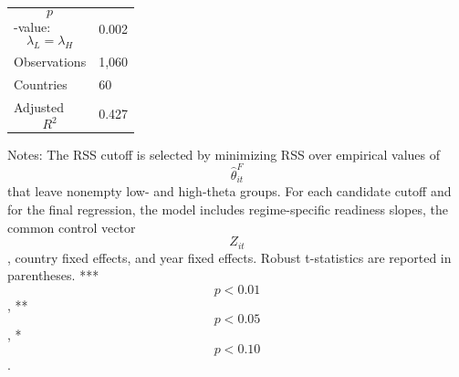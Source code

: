 \begin{table}[H]
\begin{threeparttable}
\begin{tabularx}{\textwidth}{lY}
$$p$$-value: $$\lambda_L=\lambda_H$$ & 0.002 \\
Observations & 1,060 \\
Countries & 60 \\
Adjusted $$R^2$$ & 0.427 \\
\bottomrule
\end{tabularx}
\begin{tablenotes}[flushleft]\footnotesize
\item Notes: The RSS cutoff is selected by minimizing RSS over empirical values of $$\widehat{\theta}^{F}_{it}$$ that leave nonempty low- and high-theta groups. For each candidate cutoff and for the final regression, the model includes regime-specific readiness slopes, the common control vector $$Z_{it}$$, country fixed effects, and year fixed effects. Robust t-statistics are reported in parentheses. *** $$p<0.01$$, ** $$p<0.05$$, * $$p<0.10$$.
\end{tablenotes}
\end{threeparttable}
\end{table}
